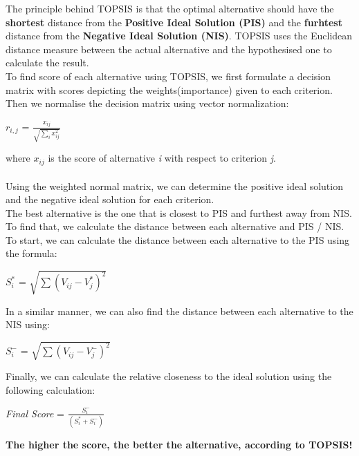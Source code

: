 \documentclass[10pt, a4paper]{article}
\begin{document}
The principle behind TOPSIS is that the optimal alternative should have the \textbf{shortest} distance from the \textbf{Positive Ideal Solution (PIS)} and the \textbf{furhtest} distance from the \textbf{Negative Ideal Solution (NIS)}.
TOPSIS uses the Euclidean distance measure between the actual alternative and the hypothesised one to calculate the result.
\\
To find score of each alternative using TOPSIS, we first formulate a decision matrix with scores depicting the weights(importance) given to each criterion.\\
Then we normalise the decision matrix using vector normalization:
\begin{center}
    
\LARGE{$r_{i,j}$ = $\frac{x_{ij}}{\sqrt{\sum_ix_{ij}^2}}$}\\
\end{center}
where \emph{$x_{ij}$} is the score of alternative \emph{i} with respect to criterion \emph{j}.\\~\\
Using the weighted normal matrix, we can determine the positive ideal solution and the negative ideal solution for each criterion.\\
The best alternative is the one that is closest to PIS and furthest away from NIS. To find that, we calculate the distance between each alternative and PIS / NIS.\\
To start, we can calculate the distance between each alternative to the PIS using the formula: 
\begin{center}
    
\large{$S_i^*$ = $\sqrt{\sum(V_{ij} - V_{j}^*)^2}$} 
\end{center}

In a similar manner, we can also find the distance between each alternative to the NIS using:
\begin{center}
    
\large{$S_i^-$ = $\sqrt{\sum(V_{ij} - V_{j}^-)^2}$} 
\end{center}

Finally, we can calculate the relative closeness to the ideal solution using the following calculation:
\begin{center}
    
\large{\emph{Final Score}} = \LARGE{$\frac{S_i^-}{(S_i^* + S_i^-)}$}
\end{center}
\textbf{The higher the score, the better the alternative, according to TOPSIS!}
\\
\end{document}

